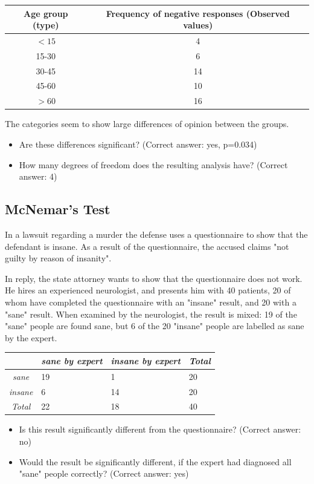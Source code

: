 \begin{table}[h]
    \centering
    \begin{tabular}{c|c}
      Age group (type) &	Frequency of negative responses (Observed values)\\
      \hline
      $<15$ & 4 \\
      15-30 & 6 \\
      30-45 & 14 \\
      45-60 & 10 \\
      $>60$ & 16
    \end{tabular}
\end{table}

The categories seem to show large differences of opinion between the groups.

\begin{itemize}
  \item     Are these differences significant?
    (Correct answer: yes, p=0.034)

  \item     How many degrees of freedom does the resulting analysis have?
    (Correct answer: 4)

\end{itemize}

\subsection*{McNemar's Test}

In a lawsuit regarding a murder the defense uses a questionnaire to show that the defendant is insane. As a result of the questionnaire, the accused claims "not guilty by reason of insanity".

In reply, the state attorney wants to show that the questionnaire does not work. He hires an experienced neurologist, and presents him with 40 patients, 20 of whom have completed the questionnaire with an "insane" result, and 20 with a "sane" result. When examined by the neurologist, the result is mixed: 19 of the "sane" people are found sane, but 6 of the 20 "insane" people are labelled as sane by the expert.

\begin{table}[h]
  \centering
  \begin{tabular}{|c|l l | l|}
  \hline
  & \emph{sane by expert} & \emph{insane by expert} & \emph{Total} \\
  \hline
  \emph{sane} & 19 & 1 & 20 \\
  \emph{insane} & 6 & 14 & 20 \\
  \hline
  \emph{Total} & 22 & 18 & 40 \\
  \hline
  \end{tabular}
\end{table}


\begin{itemize}
  \item     Is this result significantly different from the questionnaire?
    (Correct answer: no)

  \item     Would the result be significantly different, if the expert had diagnosed all "sane" people correctly?
    (Correct answer: yes)
\end{itemize}
